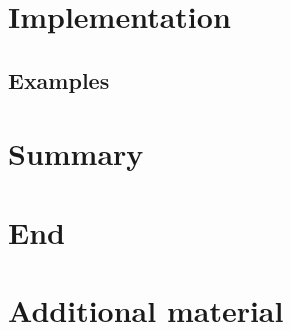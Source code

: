 \documentclass[]{beamer}
\begin{document}
\section{Implementation}
\transition

\subsection{Examples}


\section{Summary}
\transition


\section*{End}
\thankyou


\appendix
{}


\beginbackup
\section{Additional material}
\transition

\backupend
\end{document}
